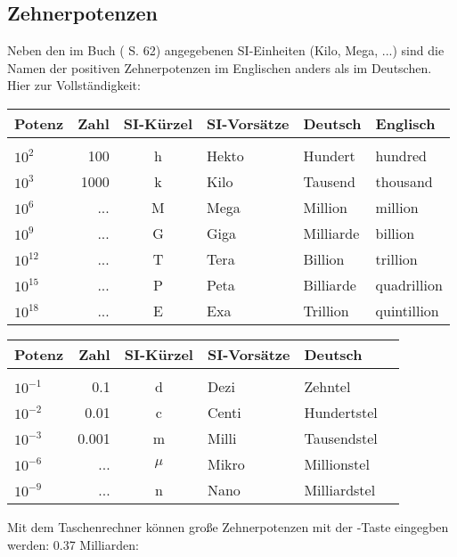 \subsection{Zehnerpotenzen}


Neben den im Buch (\cite{marthaler21alg} S. 62) angegebenen SI-Einheiten (Kilo, Mega, ...) sind die
Namen der positiven Zehnerpotenzen im Englischen anders als im
Deutschen. Hier zur Vollständigkeit:

\begin{tabular}{lrclll}
Potenz    & Zahl & SI-Kürzel & SI-Vorsätze & Deutsch & Englisch\\
\hline\\
$10^{2}$   & 100  & h         & Hekto       & Hundert   & hundred\\
$10^{3}$   & 1000 & k         & Kilo        & Tausend   & thousand\\
$10^{6}$   & ...  & M         & Mega        & Million   & million\\
$10^{9}$   & ...  & G         & Giga        & Milliarde & billion\\
$10^{12}$  & ...  & T         & Tera        & Billion   & trillion\\
$10^{15}$  & ...  & P         & Peta        & Billiarde & quadrillion\\
$10^{18}$  & ...  & E         & Exa         & Trillion  & quintillion\\
\end{tabular}

\begin{tabular}{lrclll}
Potenz     & Zahl & SI-Kürzel & SI-Vorsätze & Deutsch\\
\hline\\
$10^{-1}$  & 0.1   & d         & Dezi        & Zehntel\\
$10^{-2}$  & 0.01  & c         & Centi       & Hundertstel\\
$10^{-3}$  & 0.001 & m         & Milli       & Tausendstel\\
$10^{-6}$  & ...   & $\mu$     & Mikro       & Millionstel\\
$10^{-9}$  & ...   & n         & Nano        & Milliardstel\\
\end{tabular}

Mit dem Taschenrechner können große Zehnerpotenzen mit der
  -Taste eingegben
  werden: 0.37 Milliarden:

